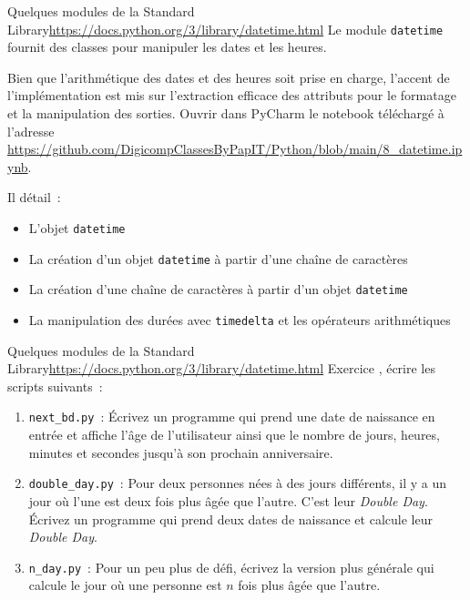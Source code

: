 \documentclass{beamer}
\begin{document}
    \begin{frame}{Quelques modules de la Standard Library}{\href{datetime}{https://docs.python.org/3/library/datetime.html}}
        Le module \lstinline{datetime} fournit des classes pour manipuler les dates et les heures.

        Bien que l'arithmétique des dates et des heures soit prise en charge, l'accent de l'implémentation est mis sur l'extraction efficace des attributs pour le formatage et la manipulation des sorties.
        \bigbreak
        Ouvrir dans PyCharm le notebook téléchargé à l'adresse \url{https://github.com/DigicompClassesByPapIT/Python/blob/main/8_datetime.ipynb}.

        Il détail~:
        \begin{itemize}
            \item L'objet \lstinline{datetime}
            \item La création d'un objet \lstinline{datetime} à partir d'une chaîne de caractères
            \item La création d'une chaîne de caractères à partir d'un objet \lstinline{datetime}
            \item La manipulation des durées avec \lstinline{timedelta} et les opérateurs arithmétiques
        \end{itemize}
    \end{frame}

    \begin{frame}{Quelques modules de la Standard Library}{\href{datetime}{https://docs.python.org/3/library/datetime.html}}
        Exercice \execcounterdispinc, écrire les scripts suivants{}~:
        \begin{enumerate}
            \item \lstinline{next_bd.py}~: Écrivez un programme qui prend une date de naissance en entrée et affiche l'âge de l'utilisateur ainsi que le nombre de jours, heures, minutes et secondes jusqu'à son prochain anniversaire.
            \item \lstinline{double_day.py}~: Pour deux personnes nées à des jours différents, il y a un jour où l'une est deux fois plus âgée que l'autre. C'est leur \textit{Double Day}.
            Écrivez un programme qui prend deux dates de naissance et calcule leur \textit{Double Day}.
            \item \lstinline{n_day.py}~: Pour un peu plus de défi, écrivez la version plus générale qui calcule le jour où une personne est $n$ fois plus âgée que l'autre.
        \end{enumerate}
    \end{frame}
\end{document}
